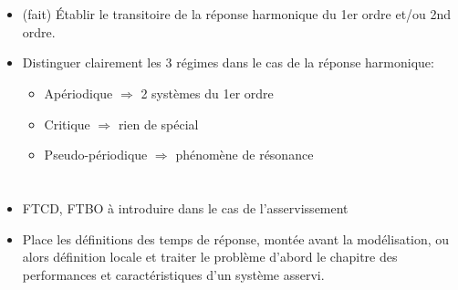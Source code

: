\section*{}
\begin{itemize}
    \item (fait) \'Etablir le transitoire de la réponse 
          harmonique du 1er ordre et/ou 2nd ordre.
\item Distinguer clairement les 3 régimes dans le cas de la réponse harmonique:
    \begin{itemize}
        \item Apériodique       $\Rightarrow$ 2 systèmes du 1er ordre
        \item Critique          $\Rightarrow$ rien de spécial
        \item Pseudo-périodique $\Rightarrow$ phénomène de résonance
    \end{itemize}
\end{itemize}
\section*{}
\begin{itemize}
    \item FTCD, FTBO à introduire dans le cas de l'asservissement
    \item Place les définitions des temps de réponse, montée avant la 
          modélisation, ou alors définition locale et traiter le problème 
          d'abord le chapitre des performances et caractéristiques d'un 
          système asservi.
\end{itemize}
